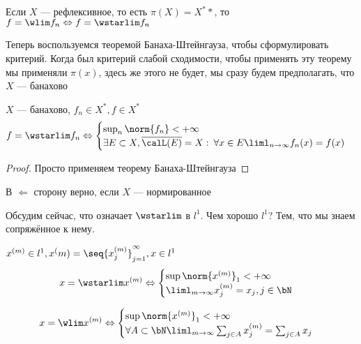 \documentclass[document]{subfiles}
\begin{document}
\begin{remark}
    Если $X$ --- рефлексивное, то есть $\pi(X) = X^**$, то $f = \wlim f_n \Leftrightarrow f = \wstarlim f_n$
\end{remark}

Теперь воспользуемся теоремой Банаха-Штейнгауза, чтобы сформулировать критерий. Когда был критерий слабой сходимости, чтобы применять эту теорему 
мы применяли $\pi(x)$, здесь же этого не будет, мы сразу будем предполагать, что $X$ --- банахово
\begin{theorem}
    $X$ --- банахово, $f_n \in X^*, f \in X^*$
    \[ f = \wstarlim f_n \Leftrightarrow \begin{cases}
        \sup_n \norm{f_n} < +\infty \\
        \exists E \subset X, \overline{\calL(E)} = X : \: \forall x \in E \liml_{n \to \infty} f_n(x) = f(x)
    \end{cases}
    \] 
\end{theorem}

\begin{proof}
    Просто применяем теорему Банаха-Штейнгауза
\end{proof}

\begin{remark}
    В $\Leftarrow$ сторону верно, если $X$ --- нормированное
\end{remark}

Обсудим сейчас, что означает $\wstarlim$ в $l^1$. Чем хорошо $l^1$? Тем, что мы знаем сопряжённое к нему.

\begin{theoremwobox}
    $x^{(m)} \in l^1, x^(m) = \seq{x^{(m)}_j}^\infty_{j=1}, x \in l^1$
    \[ x = \wstarlim x^{(m)} \Leftrightarrow \begin{cases}
        \sup \norm{x^{(m)}}_1 < +\infty \\
        \liml_{m \to \infty} x^{(m)}_j = x_j, j \in \bN
    \end{cases} \]

    \[ x = \wlim x^{(m)} \Leftrightarrow \begin{cases}
        \sup \norm{x^{(m)}}_1 < +\infty \\
        \forall A \subset \bN \liml_{m \to \infty} \sum_{j \in A} x^{(m)}_j = \sum_{j \in A} x_j
    \end{cases} \]
\end{theoremwobox}
\end{document}
